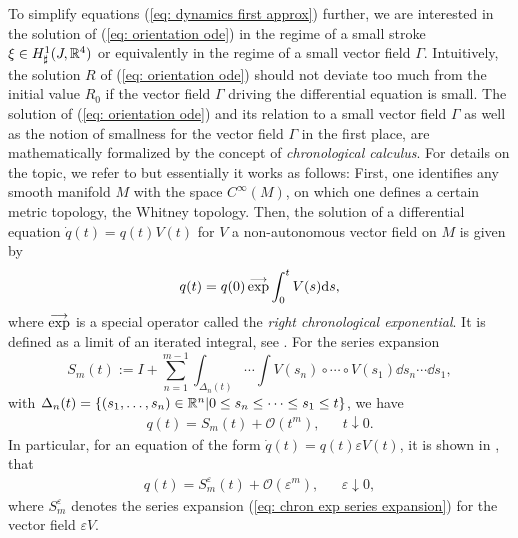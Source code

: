 To simplify equations  (\ref{eq: dynamics first approx}) further, we are interested in the solution of (\ref{eq: orientation ode}) in the regime of a small stroke $\xi \in H_{\sharp}^1(J, \mathbb{R}^4)$ or equivalently in the regime of a small vector field $\Gamma$. Intuitively, the solution $R$ of (\ref{eq: orientation ode}) should not deviate too much from the initial value $R_0$ if the vector field $\Gamma$ driving the differential equation is small. The solution of (\ref{eq: orientation ode}) and its relation to a small vector field $\Gamma$ as well as the notion of smallness for the vector field $\Gamma$ in the first place, are mathematically formalized by the concept of \emph{chronological calculus}. For details on the topic, we refer to \cite{Agrachev2004} but essentially it works as follows: First, one identifies any smooth manifold $M$ with the space $C^{\infty}(M)$, on which one defines a certain metric topology, the Whitney topology. Then, the solution of a differential equation $\dot{q}(t) = q(t) V(t)$ for $V$ a non-autonomous vector field on $M$ is given by
\begin{equation}
	q(t) = q(0)\,\overset{\longrightarrow}{\exp} \int_{0}^{t} V(s) \mathrm{d}s,
\end{equation}
where $\overset{\longrightarrow}{\exp}$ is a special operator called the \emph{right chronological exponential}. It is defined as a limit of an iterated integral, see \cite{Agrachev2004}. For the series expansion
\begin{equation}
\label{eq: chron exp series expansion}
S_m(t) := I + \sum_{n = 1}^{m-1} \int_{\Delta_n(t)} \dotsm \int V(s_n) \circ \dotsm \circ V(s_1) \dd s_n \dotsm \dd s_1,
\end{equation}
with $\Delta_n(t) = \{(s_1, \dotsc, s_n) \in \mathbb{R}^n | 0 \leq s_n \leq \dotsm \leq s_1 \leq t\}$, we have
\begin{align}
q(t) = S_m(t) + \mathcal{O}(t^m), & & t \downarrow 0.
\end{align}
In particular, for an equation of the form $\dot{q}(t) = q(t) \varepsilon V(t)$, it is shown in \cite{Agrachev2004}, that
\begin{align}
\label{eq: estimation of chronological exponential}
	q(t) = S_m^{\varepsilon}(t) + \mathcal{O}(\varepsilon^m), & & \varepsilon \downarrow 0,
\end{align}
where $S_{m}^{\varepsilon}$ denotes the series expansion (\ref{eq: chron exp series expansion}) for the vector field $\varepsilon V$.

